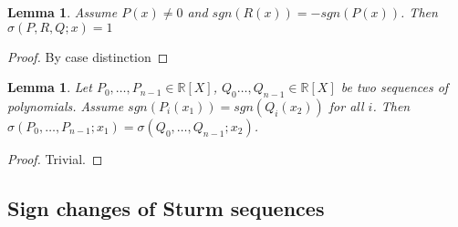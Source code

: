 \documentclass[11pt,a4paper,oneside]{article}
\newtheorem{lemma}[definition]{Lemma}
\newcommand{\RR}{\mathbb{R}}
\newcommand{\sgn}{\mathit{sgn}}
\begin{document}
\begin{lemma}\label{thm:sign_changes_triple}
Assume $P(x)\neq 0$ and $\sgn(R(x)) = -\sgn(P(x))$. Then $\sigma(P,R,Q; x) = 1$
\end{lemma}
\begin{proof}
By case distinction
\end{proof}

\begin{lemma}\label{thm:same_signs}
Let $P_0,\ldots,P_{n-1}\in\RR[X]$, $Q_0\ldots,Q_{n-1}\in\RR[X]$ be two sequences of polynomials. Assume $\mathit{sgn}(P_i(x_1))=\mathit{sgn}(Q_i(x_2))$ for all $i$. Then $\sigma(P_0,\ldots,P_{n-1};x_1)=\sigma(Q_0,\ldots,Q_{n-1};x_2)$.
\end{lemma}
\begin{proof}
Trivial.
\end{proof}


\subsection{Sign changes of Sturm sequences}
\end{document}
